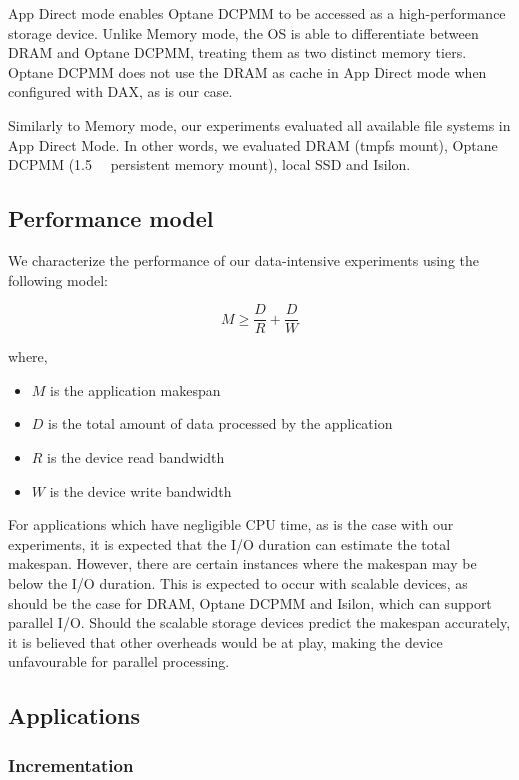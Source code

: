 App Direct mode enables Optane DCPMM to be accessed as a high-performance
storage device. Unlike Memory mode, the OS is able to differentiate between DRAM
and Optane DCPMM, treating them as two distinct memory tiers. Optane DCPMM does
not use the DRAM as cache in App Direct mode when configured with DAX, as is our
case.

Similarly to Memory mode, our experiments evaluated all available file systems
in App Direct Mode. In other words, we evaluated DRAM (tmpfs mount), Optane
DCPMM (\SI{1.5}{\tebi\byte} persistent memory mount), local SSD and Isilon.


\subsection{Performance model}

We characterize the performance of our data-intensive experiments using the
following model:

\begin{equation}
    M \geq \frac{D}{R} + \frac{D}{W} \label{eq:optane:makespan}
\end{equation}

where,
\begin{itemize}
        \item $M$ is the application makespan
        \item $D$ is the total amount of data processed by the application
        \item $R$ is the device read bandwidth
        \item $W$ is the device write bandwidth
\end{itemize}

For applications which have negligible CPU time, as is the case with our
experiments, it is expected that the I/O duration can estimate the total
makespan. However, there are certain instances where the makespan may be below
the I/O duration. This is expected to occur with scalable devices, as should be
the case for DRAM, Optane DCPMM and Isilon, which can support parallel I/O.
Should the scalable storage devices predict the makespan accurately, it is
believed that other overheads would be at play, making the device unfavourable
for parallel processing.

\subsection{Applications}
\subsubsection{ \bigbrain Incrementation}

